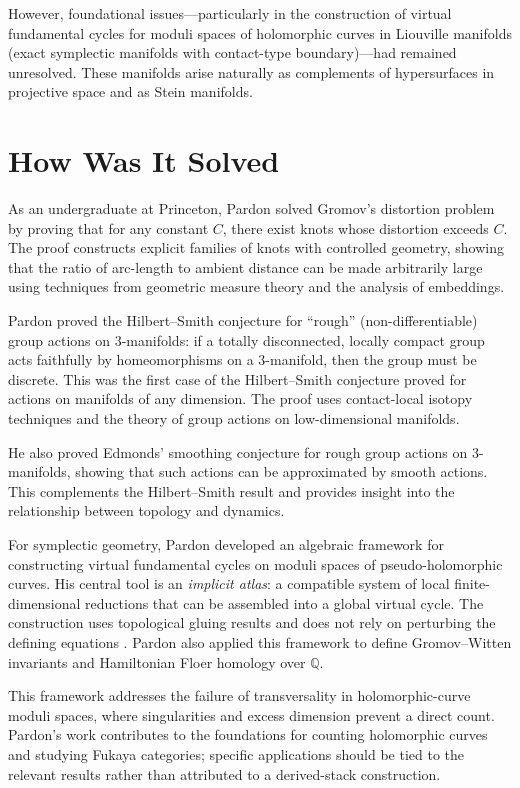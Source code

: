 However, foundational issues---particularly in the construction of virtual fundamental cycles for moduli spaces of holomorphic curves in Liouville manifolds (exact symplectic manifolds with contact-type boundary)---had remained unresolved. These manifolds arise naturally as complements of hypersurfaces in projective space and as Stein manifolds.

\section{How Was It Solved}

As an undergraduate at Princeton, Pardon solved Gromov's distortion problem by proving that for any constant $C$, there exist knots whose distortion exceeds $C$. The proof constructs explicit families of knots with controlled geometry, showing that the ratio of arc-length to ambient distance can be made arbitrarily large using techniques from geometric measure theory and the analysis of embeddings.

Pardon proved the Hilbert--Smith conjecture for ``rough'' (non-differentiable) group actions on 3-manifolds: if a totally disconnected, locally compact group acts faithfully by homeomorphisms on a 3-manifold, then the group must be discrete. This was the first case of the Hilbert--Smith conjecture proved for actions on manifolds of any dimension. The proof uses contact-local isotopy techniques and the theory of group actions on low-dimensional manifolds.

He also proved Edmonds' smoothing conjecture for rough group actions on 3-manifolds, showing that such actions can be approximated by smooth actions. This complements the Hilbert--Smith result and provides insight into the relationship between topology and dynamics.

For symplectic geometry, Pardon developed an algebraic framework for constructing virtual fundamental cycles on moduli spaces of pseudo-holomorphic curves. His central tool is an \emph{implicit atlas}: a compatible system of local finite-dimensional reductions that can be assembled into a global virtual cycle. The construction uses topological gluing results and does not rely on perturbing the defining equations \cite{pardon2016}. Pardon also applied this framework to define Gromov--Witten invariants and Hamiltonian Floer homology over $\mathbb{Q}$.

This framework addresses the failure of transversality in holomorphic-curve moduli spaces, where singularities and excess dimension prevent a direct count. Pardon’s work contributes to the foundations for counting holomorphic curves and studying Fukaya categories; specific applications should be tied to the relevant results rather than attributed to a derived-stack construction.

